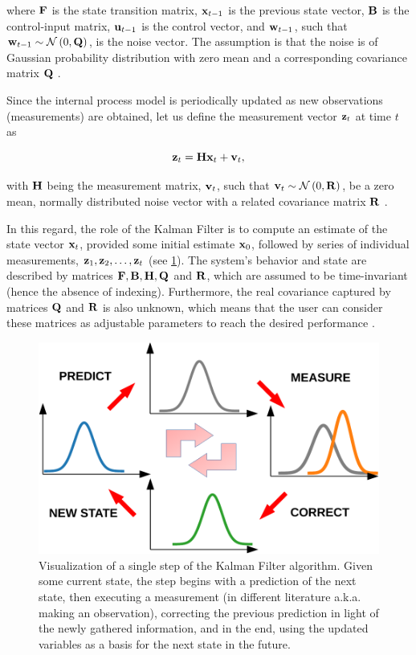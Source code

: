 \noindent  where $\mathbf{F}$ is the state transition matrix, $\mathbf{x}_{t - 1}$ is the previous state vector, $\mathbf{B}$ is the control-input matrix, $\mathbf{u}_{t - 1}$ is the control vector, and $\mathbf{w}_{t - 1}$, such that $\mathbf{w}_{t - 1} \sim \mathcal{N} \left( {0, \mathbf{Q}} \right)$, is the noise vector. The assumption is that the noise is of Gaussian probability distribution with zero mean and a corresponding covariance matrix $\mathbf{Q}$ \cite{kim2018introduction}.

Since the internal process model is periodically updated as new observations (measurements) are obtained, let us define the measurement vector $\mathbf{z}_t$ at time $t$ as

\begin{equation}
    \mathbf{z}_t = \mathbf{H} \mathbf{x}_t + \mathbf{v}_t,
\end{equation}

\noindent with $\mathbf{H}$ being the measurement matrix, $\mathbf{v}_t$, such that $\mathbf{v}_{t} \sim \mathcal{N} \left( {0, \mathbf{R}} \right)$, be a zero mean, normally distributed noise vector with a related covariance matrix $\mathbf{R}$ \cite{kim2018introduction}.

In this regard, the role of the Kalman Filter is to compute an estimate of the state vector $\mathbf{x}_t$, provided some initial estimate $\mathbf{x}_0$, followed by series of individual measurements, $\mathbf{z}_1, \mathbf{z}_2, \dots, \mathbf{z}_t$ (see \cref{fig:KalmanFilterDiagram}). The system's behavior and state are described by matrices $\mathbf{F}, \mathbf{B}, \mathbf{H}, \mathbf{Q}$ and $\mathbf{R}$, which are assumed to be time-invariant (hence the absence of indexing). Furthermore, the real covariance captured by matrices $\mathbf{Q}$ and $\mathbf{R}$ is also unknown, which means that the user can consider these matrices as adjustable parameters to reach the desired performance \cite{kim2018introduction}.

\begin{figure}[t]
    \centerline{\includegraphics[width=0.7\linewidth]{figures/theoretical_foundations/kalman_filter_diagram.pdf}}
    \caption[A single iteration of the Kalman Filter]{Visualization of a single step of the Kalman Filter algorithm. Given some current state, the step begins with a prediction of the next state, then executing a measurement (in different literature a.k.a. making an observation), correcting the previous prediction in light of the newly gathered information, and in the end, using the updated variables as a basis for the next state in the future.}
    \label{fig:KalmanFilterDiagram}
\end{figure}

